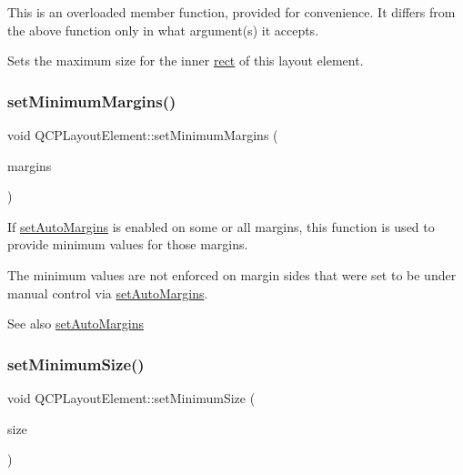 This is an overloaded member function, provided for convenience. It differs from the above function only in what argument(s) it accepts.

Sets the maximum size for the inner \hyperlink{class_q_c_p_layout_element_a208effccfe2cca4a0eaf9393e60f2dd4}{rect} of this layout element. \mbox{\label{class_q_c_p_layout_element_a0a8a17abc16b7923159fcc7608f94673}} 
\subsubsection{\texorpdfstring{set\+Minimum\+Margins()}{setMinimumMargins()}}
{\footnotesize\ttfamily void Q\+C\+P\+Layout\+Element\+::set\+Minimum\+Margins (\begin{DoxyParamCaption}\item[{const Q\+Margins \&}]{margins }\end{DoxyParamCaption})}

If \hyperlink{class_q_c_p_layout_element_accfda49994e3e6d51ed14504abf9d27d}{set\+Auto\+Margins} is enabled on some or all margins, this function is used to provide minimum values for those margins.

The minimum values are not enforced on margin sides that were set to be under manual control via \hyperlink{class_q_c_p_layout_element_accfda49994e3e6d51ed14504abf9d27d}{set\+Auto\+Margins}.

\begin{DoxySeeAlso}{See also}
\hyperlink{class_q_c_p_layout_element_accfda49994e3e6d51ed14504abf9d27d}{set\+Auto\+Margins} 
\end{DoxySeeAlso}
\mbox{\label{class_q_c_p_layout_element_a5dd29a3c8bc88440c97c06b67be7886b}} 
\subsubsection{\texorpdfstring{set\+Minimum\+Size()}{setMinimumSize()}\hspace{0.1cm}{\footnotesize\ttfamily [1/2]}}
{\footnotesize\ttfamily void Q\+C\+P\+Layout\+Element\+::set\+Minimum\+Size (\begin{DoxyParamCaption}\item[{const Q\+Size \&}]{size }\end{DoxyParamCaption})}

